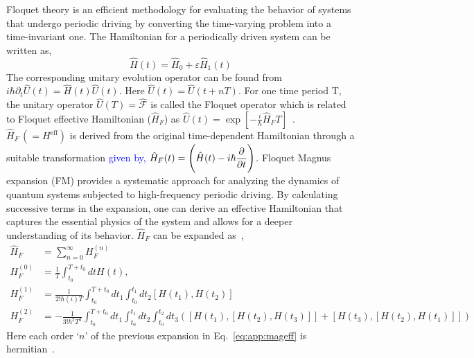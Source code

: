 \documentclass[%
reprint,
superscriptaddress,
amsmath,amssymb,showkeys,
aps,
prb,
]{revtex4-2}
\newcommand{\blue}[1]{\textcolor{blue}{#1}}
\begin{document}
	Floquet theory is an efficient methodology for evaluating the behavior of systems that undergo periodic driving by converting the time-varying problem into a time-invariant one. The Hamiltonian for a periodically driven system can be written as,
	\begin{equation*}
		\hat{H}(t) = \hat{H}_0 + \varepsilon \hat{H}_1(t)
	\end{equation*}
	The corresponding unitary evolution operator can be found from $\displaystyle{i\hbar \partial_t \hat{U}(t) = \hat{H}(t) \hat{U}(t)}$. Here $\displaystyle{\hat{U}(t) = \hat{U}(t+ nT)}$. For one time period T, the unitary operator $\displaystyle \hat{U}(T) = \hat{\mathcal{F}}$ is called the Floquet operator which is related to Floquet effective Hamiltonian ($\hat{H}_F$) as $\hat{U}(t) = \exp[-\frac{i}{\hbar}\hat{H}_F T]$~\cite{Eckardt_2015}. $\hat{H}_F\,(=H^\mathrm{eff})$ is derived from the original time-dependent Hamiltonian through a suitable transformation  \blue{given by, $\displaystyle \hat{H}_F(t) = \Bigg(\hat{H}(t) - i\hbar \pdv{t}\Bigg)$}\cite{linda_chaos}. Floquet Magnus expansion (FM) provides a systematic approach for analyzing the dynamics of quantum systems subjected to high-frequency periodic driving. By calculating successive terms in the expansion, one can derive an effective Hamiltonian that captures the essential physics of the system and allows for a deeper understanding of its behavior. $\hat{H}_F$ can be expanded as~\cite{Sen_2021},	
	\begin{align}
		\hat{H}_F &= \sum_{n=0}^{\infty} H_F^{(n)}\nonumber\\
		H_F^{(0)} &= \frac{1}{T} \int_{t_0}^{T+t_0} dt H(t), \nonumber\\
		H_F^{(1)} &= \frac{1}{2!\hbar(i)T} \int_{t_0}^{T+t_0} dt_1  \int_{t_0}^{t_1} dt_2 [H(t_1), H(t_2)]\nonumber\\
		H_F^{(2)} &= -\frac{1}{3!\hbar^2 T^3} \int_{t_0}^{T+t_0} dt_1  \int_{t_0}^{t_1} dt_2 \int_{t_0}^{t_2} dt_3([H(t_1),[H(t_2), H(t_3)]] + [H(t_3),[H(t_2), H(t_1)]])
		\label{eq:app:mageff}
	\end{align} 
	Here each order `$n$' of the previous expansion in Eq.~\ref{eq:app:mageff} is hermitian~\cite{haldar_statistical_2022}.
	
\end{document}
